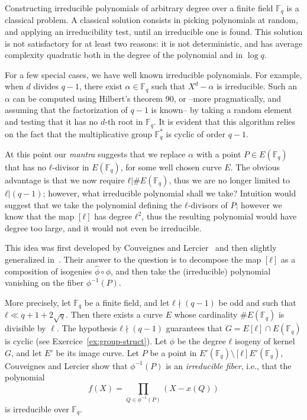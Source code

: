\documentclass[10pt]{article}
\theoremstyle{plain}
\theoremstyle{definition}
\def\F{\ensuremath{\mathbb{F}}}
\begin{document}
Constructing irreducible polynomials of arbitrary degree over a finite
field $\F_q$ is a classical problem. %
A classical solution consists in picking polynomials at random, and
applying an irreducibility test, until an irreducible one is found. %
This solution is not satisfactory for at least two reasons: it is not
deterministic, and has average complexity quadratic both in the degree
of the polynomial and in $\log q$.

For a few special cases, we have well known irreducible polynomials. %
For example, when $d$ divides $q-1$, there exist $α∈\F_q$ such that
$X^d-α$ is irreducible. %
Such an $α$ can be computed using Hilbert's theorem 90, or --more
pragmatically, and assuming that the factorization of $q-1$ is known--
by taking a random element and testing that it has no $d$-th root in
$\F_q$. %
It is evident that this algorithm relies on the fact that the
multiplicative group $\F_q^*$ is cyclic of order $q-1$.

At this point our \emph{mantra} suggests that we replace $α$ with a
point $P∈E(\F_q)$ that has no $ℓ$-divisor in $E(\F_q)$, for some well
chosen curve $E$. %
The obvious advantage is that we now require $ℓ|\#E(\F_q)$, thus we
are no longer limited to $ℓ|(q-1)$; however, what irreducible
polynomial shall we take? %
Intuition would suggest that we take the polynomial defining the
$ℓ$-divisors of $P$; however we know that the map $[ℓ]$ has degree
$ℓ^2$, thus the resulting polynomial would have degree too large, and
it would not even be irreducible.

This idea was first developed by Couveignes and
Lercier~\cite{couveignes+lercier11} and then slightly generalized
in~\cite{DeDoSc13}. %
Their answer to the question is to decompose the map $[ℓ]$ as a
composition of isogenies $\hat{ϕ}∘ϕ$, and then take the (irreducible)
polynomial vanishing on the fiber $ϕ^{-1}(P)$.

More precisely, let $\F_q$ be a finite field, and let $ℓ\nmid(q-1)$ be
odd and such that $ℓ\ll q+1+2\sqrt{q}$. %
Then there exists a curve $E$ whose cardinality $\#E(\F_q)$ is
divisible by $\ell$. %
The hypothesis $ℓ\nmid(q-1)$ guarantees that $G = E[ℓ]∩E(\F_q)$ is
cyclic (see Exercice~\ref{ex:group-struct}). %
Let $ϕ$ be the degree $ℓ$ isogeny of kernel $G$, and let $E'$ be its
image curve. %
Let $P$ be a point in $E'(\F_q)\setminus [ℓ]E'(\F_q)$, Couveignes and
Lercier show that $\phi^{-1}(P)$ is an \emph{irreducible fiber}, i.e.,
that the polynomial
\[f(X) = \prod_{Q\in\phi^{-1}(P)}(X - x(Q))\]
is irreducible over $\F_q$.
\end{document}
